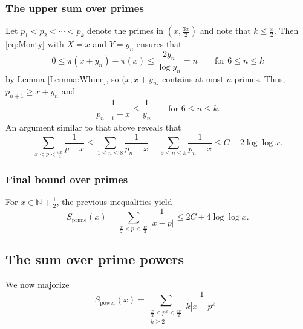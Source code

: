 \documentclass[10pt,reqno]{amsart}
\theoremstyle{plain}
\theoremstyle{definition}
\newcommand{\N}{\mathbb{N}}
\begin{document}
\subsubsection{The upper sum over primes}
Let $p_1<p_2< \cdots < p_k$ denote the primes in $(x, \frac{3x}{2})$ and note that $k \leq \frac{x}{2}$.
Then \eqref{eq:Monty} with $X = x$ and $Y = y_n$ ensures that
\begin{equation*}
0 \leq \pi(x+y_n) - \pi(x) \leq \frac{2y_n}{\log y_n} = n \qquad \text{for $6 \leq n \leq k$}
\end{equation*}
by Lemma \ref{Lemma:Whine}, so $(x, x+y_n]$ contains at most $n$ primes.  Thus,
$p_{n+1} \geq x + y_n$ and 
\begin{equation}\label{eq:xpy2}
\frac{1}{p_{n+1} - x} \leq \frac{1}{y_n} \qquad \text{for $6 \leq n \leq k$}.
\end{equation}
An argument similar to that above reveals that
\begin{equation*}
\sum_{x < p < \frac{3x}{2} } \frac{1}{p-x}
\leq \sum_{1\leq n \leq 8} \frac{1}{p_n -x} + \sum_{9\leq n \leq k} \frac{1}{p_n-x }
 \leq C +2 \log\log x.
\end{equation*}

\subsubsection{Final bound over primes}
For $x \in \N + \frac{1}{2}$, the previous inequalities yield
\begin{equation}\label{eq:PrimeBoundFinal}
S_{\mathrm{prime}}(x)
= \sum_{ \frac{x}{2} < p < \frac{3x}{2}}  \frac{1}{ | x-p |} 
\leq   2C +4 \log\log x.
\end{equation}






\subsection{The sum over prime powers}\label{Subsection:SumPP}
We now majorize
\begin{equation*}
S_{\mathrm{power}}(x) = \sum_{ \substack{ \frac{x}{2} < p^k <\frac{3x}{2} \\ k\geq 2}}  \frac{1}{ k | x-p^k |}.
\end{equation*}
\end{document}
